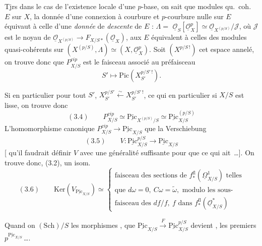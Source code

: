 \documentclass[11pt,a4paper]{article}
\begin{document}
Tjrs dans le cas de l'existence locale d'une $p$-base, on sait que  modules  qu.\ coh.\ $E$ sur $X$, la donnée d'une connexion à courbure et $p$-courbure nulle \struck{\ill{}} sur $E$ équivaut à celle d'une \emph{donnée} de \emph{descente} de $E$ : $\Lambda =$  $\underline{\mathcal{O}}_{S}[\underline{\mathcal{O}}_{X}^{p}] \simeq \underline{\mathcal{O}}_{X^{(p/S)}}/\mathcal{J}$, où $\mathcal{J}$ est le noyau de $\underline{\mathcal{O}}_{X^{(p/S)}} \to F_{X/S*}(\underline{\mathcal{O}}_{X})$,  \add{\ill{}}  \ill{} aux  $E$ équivalent à celles des modules quasi-cohérents sur $(X^{(p/S)}, \Lambda) \simeq (X, \underline{\mathcal{O}}_{X}^{p})$. Soit $(X^{p/S\,!})$ cet espace annelé, on trouve donc que $P^{cip}_{X/S}$ est le faisceau associé au préfaisceau
\[
S' \mapsto \mathrm{Pic}(X_{S'}^{p/S'\,!}).
\]

Si en particulier pour tout $S'$, $X_{S'}^{p/S'} \xleftarrow{\sim} X_{S'}^{p/S'\,!}$, ce qui   en particulier si $X/S$ est lisse, on trouve donc
\[
(3.4) \qquad P^{cip}_{X/S} \simeq \underline{\mathrm{Pic}}_{X^{(p/S)}/S} \simeq \underline{\mathrm{Pic}}_{X/S}^{(p/S)}
\]
L'homomorphisme canonique $P^{cip}_{X/S} \to \underline{\mathrm{Pic}}_{X/S}$  que la Verschiebung
\[
(3.5) \qquad V : \underline{\mathrm{Pic}}^{p/S}_{X/S} \to \underline{\mathrm{Pic}}_{X/S}
\]
[ qu'il faudrait définir $V$ avec une généralité suffisante pour que ce qui  ait \,…]. On trouve donc,  (3.2), un isom.
\[
(3.6) \qquad \mathrm{Ker}(V_{\underline{\mathrm{Pic}}_{X/S}}) \simeq
\left\{
\begin{array}{l}
\text{faisceau des sections de } f^{\mathrm{fl}}_{*}(\underline{\Omega}^{1}_{X/S}) \text{ telles} \\
\text{que } d\omega = 0,\ C\omega = \tilde{\omega}, \text{ modulo les sous-} \\
\text{faisceau des } df/f,\ f \text{ dans } f^{\mathrm{fl}}_{*}(\underline{\mathcal{O}}^{*}_{X/S})
\end{array}
\right.
\]

Quand on   $(\mathrm{Sch})/S$ les \struck{\ill{}} morphismes   \ill{}, \struck{\ill{}}  que $\underline{\mathrm{Pic}}_{X/S} \xrightarrow{F} \underline{\mathrm{Pic}}^{p/S}_{X/S}$ devient , \ill{} les \struck{\ill{}} premiers   $p^{\underline{\mathrm{Pic}}_{X/S}}$\,….
\end{document}
